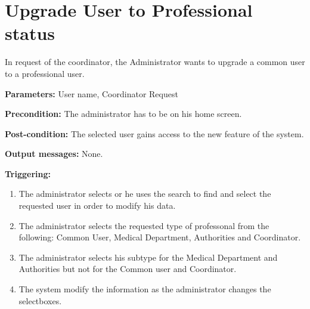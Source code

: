 \section{Upgrade User to Professional status}
\label{operation:UpgradeUser}
In request of the coordinator, the Administrator wants to upgrade a common user
to a professional user.\\
\begin{description}
\item \textbf{Parameters:} User name, Coordinator Request
\item \textbf{Precondition:} The administrator has to be on his home screen.
\item \textbf{Post-condition:}  The selected user gains access to the new
feature of the system.
\item \textbf{Output messages:} None.
\item \textbf{Triggering:}
\begin{enumerate}
\item The administrator selects or he uses the search to find and select the
requested user in order to modify his data.
\item The administrator selects the requested type of professonal from the
following: Common User, Medical Department, Authorities and Coordinator.
\item The administrator selects his subtype for the Medical Department and
Authorities but not for the Common user and Coordinator.
\item The system modify the information as the administrator changes the
selectboxes.
\end{enumerate}
\end{description}

